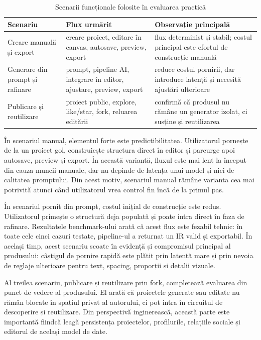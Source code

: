 \begin{table}[H]
  \centering
  \caption{Scenarii funcționale folosite în evaluarea practică}
  \label{tab:scenarii-evaluare}
  \renewcommand{\arraystretch}{1.15}
  \begin{tabularx}{\textwidth}{>{\RaggedRight\arraybackslash}p{3.6cm}YY}
    \toprule
    \textbf{Scenariu} & \textbf{Flux urmărit} & \textbf{Observație principală} \\
    \midrule
    Creare manuală și export & creare proiect, editare în canvas, autosave, preview, export & flux determinist și stabil; costul principal este efortul de construcție manuală \\
    Generare din prompt și rafinare & prompt, pipeline AI, integrare în editor, ajustare, preview, export & reduce costul pornirii, dar introduce latență și necesită ajustări ulterioare \\
    Publicare și reutilizare & proiect public, explore, like/star, fork, reluarea editării & confirmă că produsul nu rămâne un generator izolat, ci susține și reutilizarea \\
    \bottomrule
  \end{tabularx}
\end{table}

În scenariul manual, elementul forte este predictibilitatea. Utilizatorul pornește de la un proiect gol, construiește structura direct în editor și parcurge apoi autosave, preview și export. În această variantă, fluxul este mai lent la început din cauza muncii manuale, dar nu depinde de latența unui model și nici de calitatea promptului. Din acest motiv, scenariul manual rămâne varianta cea mai potrivită atunci când utilizatorul vrea control fin încă de la primul pas.

În scenariul pornit din prompt, costul inițial de construcție este redus. Utilizatorul primește o structură deja populată și poate intra direct în faza de rafinare. Rezultatele benchmark-ului arată că acest flux este fezabil tehnic: în toate cele cinci cazuri testate, pipeline-ul a returnat un IR valid și exportabil. În același timp, acest scenariu scoate în evidență și compromisul principal al produsului: câștigul de pornire rapidă este plătit prin latență mare și prin nevoia de reglaje ulterioare pentru text, spacing, proporții și detalii vizuale.

Al treilea scenariu, publicare și reutilizare prin fork, completează evaluarea din punct de vedere al produsului. El arată că proiectele generate sau editate nu rămân blocate în spațiul privat al autorului, ci pot intra în circuitul de descoperire și reutilizare. Din perspectivă inginerească, această parte este importantă fiindcă leagă persistența proiectelor, profilurile, relațiile sociale și editorul de același model de date.

